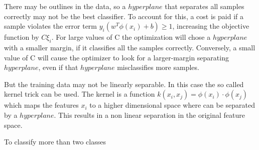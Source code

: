 
There may be outlines in the data, so a \(hyperplane\) that separates all samples correctly may not be the best classifier. To account for this, a cost is paid if a sample violates the error term \(y_{i}\left ( w^{T}\phi \left ( x_{i} \right )+b \right )\geq 1\), increasing the objective function by \(C \xi_{i}\). For large values of C the optimization will chose a \(hyperplane\) with a smaller margin, if it classifies all the samples correctly. Conversely, a small value of C will cause the optimizer to look for a larger-margin separating \(hyperplane\), even if that \(hyperplane\) misclassifies more samples\cite{crossValidatedSVMC}.

But the training data may not be linearly separable. In this case the so called kernel trick can be used. The kernel is a function \(k\left ( x_{i}, x_{j} \right )=\phi \left ( x_{i} \right )\cdot \phi\left ( x_{j} \right )\) which maps the features \(x_{i}\) to a higher dimensional space where  can be separated by a \(hyperplane\). This results in a non linear separation in the original feature space\cite{ErikKimKernelTrick}.

To classify more than two classes 



